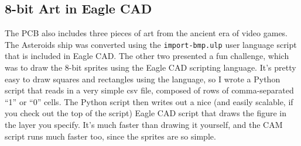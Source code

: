\documentclass[12pt]{article}
\newcommand{\+}{\item}		%
\begin{document}
\clearpage
\newpage

\subsection*{8-bit Art in Eagle CAD}

The PCB also includes three pieces of art from the ancient era of video games. The Asteroids ship was converted using the \texttt{import-bmp.ulp} user language script that is included in Eagle CAD. The other two presented a fun challenge, which was to draw the 8-bit sprites using the Eagle CAD scripting language. It's pretty easy to draw squares and rectangles using the language, so I wrote a Python script that reads in a very simple csv file, composed of rows of comma-separated ``1'' or ``0'' cells. The Python script then writes out a nice (and easily scalable, if you check out the top of the script) Eagle CAD script that draws the figure in the layer you specify. It's much faster than drawing it yourself, and the CAM script runs much faster too, since the sprites are so simple.

\medskip
\end{document}
